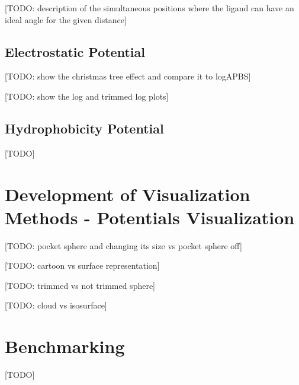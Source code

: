     [TODO: description of the simultaneous positions where the ligand can have an ideal angle for the given distance]

  \subsection{Electrostatic Potential}
    [TODO: show the christmas tree effect and compare it to logAPBS]

    [TODO: show the log and trimmed log plots]

  \subsection{Hydrophobicity Potential}
    [TODO]


\section{Development of Visualization Methods - Potentials Visualization}
  [TODO: pocket sphere and changing its size vs pocket sphere off]

  [TODO: cartoon vs surface representation]

  [TODO: trimmed vs not trimmed sphere]

  [TODO: cloud vs isosurface]


\section{Benchmarking}
  [TODO]


